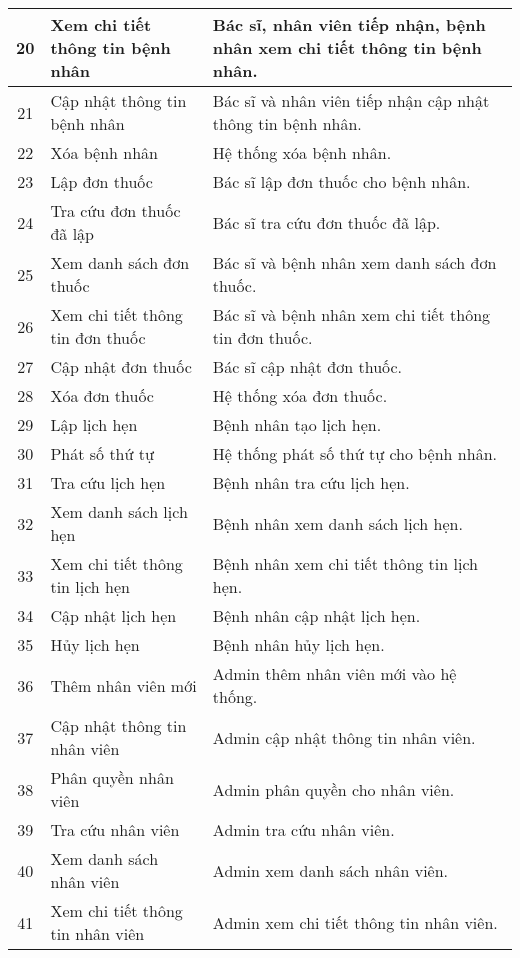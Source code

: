 \begin{longtable}{|c|p{4cm}|p{8cm}|}
  \hline
  20 & Xem chi tiết thông tin bệnh nhân & Bác sĩ, nhân viên tiếp nhận, bệnh nhân xem chi tiết thông tin bệnh nhân. \\
  \hline
  21 & Cập nhật thông tin bệnh nhân & Bác sĩ và nhân viên tiếp nhận cập nhật thông tin bệnh nhân. \\
  \hline
  22 & Xóa bệnh nhân & Hệ thống xóa bệnh nhân. \\
  \hline
  23 & Lập đơn thuốc & Bác sĩ lập đơn thuốc cho bệnh nhân. \\
  \hline
  24 & Tra cứu đơn thuốc đã lập & Bác sĩ tra cứu đơn thuốc đã lập. \\
  \hline
  25 & Xem danh sách đơn thuốc & Bác sĩ và bệnh nhân xem danh sách đơn thuốc. \\
  \hline
  26 & Xem chi tiết thông tin đơn thuốc & Bác sĩ và bệnh nhân xem chi tiết thông tin đơn thuốc. \\
  \hline
  27 & Cập nhật đơn thuốc & Bác sĩ cập nhật đơn thuốc. \\
  \hline
  28 & Xóa đơn thuốc & Hệ thống xóa đơn thuốc. \\
  \hline
  29 & Lập lịch hẹn & Bệnh nhân tạo lịch hẹn. \\
  \hline
  30 & Phát số thứ tự & Hệ thống phát số thứ tự cho bệnh nhân. \\
  \hline
  31 & Tra cứu lịch hẹn & Bệnh nhân tra cứu lịch hẹn. \\
  \hline
  32 & Xem danh sách lịch hẹn & Bệnh nhân xem danh sách lịch hẹn. \\
  \hline
  33 & Xem chi tiết thông tin lịch hẹn & Bệnh nhân xem chi tiết thông tin lịch hẹn. \\
  \hline
  34 & Cập nhật lịch hẹn & Bệnh nhân cập nhật lịch hẹn. \\
  \hline
  35 & Hủy lịch hẹn & Bệnh nhân hủy lịch hẹn. \\
  \hline
  36 & Thêm nhân viên mới & Admin thêm nhân viên mới vào hệ thống. \\
  \hline
  37 & Cập nhật thông tin nhân viên & Admin cập nhật thông tin nhân viên. \\
  \hline
  38 & Phân quyền nhân viên & Admin phân quyền cho nhân viên. \\
  \hline
  39 & Tra cứu nhân viên & Admin tra cứu nhân viên. \\
  \hline
  40 & Xem danh sách nhân viên & Admin xem danh sách nhân viên. \\
  \hline
  41 & Xem chi tiết thông tin nhân viên & Admin xem chi tiết thông tin nhân viên. \\

\end{longtable}
